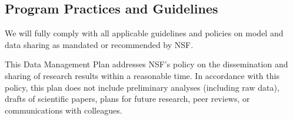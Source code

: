 \documentclass[11pt]{NSFamsart}
\begin{document}
\subsection*{Program Practices and Guidelines} We will fully comply with all applicable guidelines and policies on model and data sharing as mandated or recommended by NSF.

\bigskip

\noindent This Data Management Plan addresses NSF’s policy on the dissemination and sharing of research results within a reasonable time.  In accordance with this policy, this plan does not include preliminary analyses (including raw data), drafts of scientific papers, plans for future research, peer reviews, or communications with colleagues. 
\end{document}
